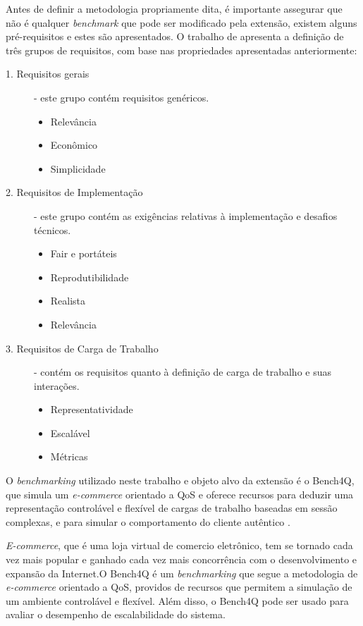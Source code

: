 Antes de definir a metodologia propriamente dita, é importante assegurar que não é qualquer \textit{benchmark} que pode ser modificado pela extensão, existem alguns pré-requisitos e estes são apresentados. O trabalho de  apresenta a definição de três grupos de requisitos, com base nas propriedades apresentadas anteriormente:

\begin{description}
	\item[1. Requisitos gerais] - este grupo contém requisitos genéricos. 
	\begin{itemize}
		\item Relevância
		\item Econômico
		\item Simplicidade
	\end{itemize}
	
	\item[2. Requisitos de Implementação] - este grupo contém as exigências relativas à implementação e desafios técnicos. \hfill 
	\begin{itemize}
		\item Fair e portáteis
		\item Reprodutibilidade
		\item Realista
		\item Relevância
	\end{itemize}
	
	\item[3. Requisitos de Carga de Trabalho ] - contém os requisitos quanto à definição de carga de trabalho e suas interações. \hfill 
	\begin{itemize}
		\item Representatividade
		\item Escalável
		\item Métricas
	\end{itemize}
	
\end{description}


O \textit{benchmarking} utilizado neste trabalho e objeto alvo da extensão é o Bench4Q, que simula um \textit{e-commerce} orientado a QoS e oferece recursos para deduzir uma representação controlável e flexível de cargas de trabalho baseadas em sessão complexas, e para simular o comportamento do cliente autêntico \cite{Bench4Q}.

\textit{E-commerce}, que é uma loja virtual de comercio eletrônico, tem se tornado cada vez mais popular e ganhado cada vez mais concorrência com o desenvolvimento e expansão da Internet.O Bench4Q é um \textit{benchmarking} que segue a metodologia de \textit{e-commerce} orientado a QoS, providos de recursos que permitem a simulação de um ambiente controlável e flexível. Além disso, o Bench4Q pode ser usado para avaliar o desempenho de escalabilidade do sistema.

